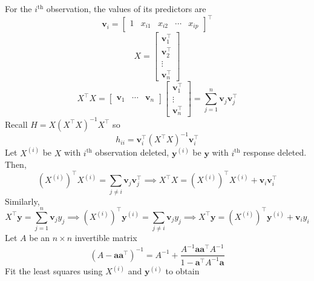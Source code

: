 For the $ i^{\text{th}} $ observation, the values
of its predictors are
\[ \symbf{v}_i=\begin{bmatrix}
        1 & x_{i1} & x_{i2} & \cdots & x_{i p}
    \end{bmatrix}^\top \]
\[ X=\begin{bmatrix}
        \symbf{v}_1^\top \\
        \symbf{v}_2^\top \\
        \vdots           \\
        \symbf{v}_n^\top
    \end{bmatrix} \]
\[ X^\top X=\begin{bmatrix}
        \symbf{v}_1 & \cdots & \symbf{v}_n
    \end{bmatrix}\begin{bmatrix}
        \symbf{v}_1^\top \\
        \vdots           \\
        \symbf{v}_n^\top
    \end{bmatrix}=\sum_{j=1}^{n}\symbf{v}_j\symbf{v}_j^\top \]
Recall $ H=X(X^\top X)^{-1}X^\top $ so
\[ h_{ii}=\symbf{v}_i^\top (X^\top X)^{-1}\symbf{v}_i^\top \]
Let $ X^{(i)} $ be $ X $ with $ i^{\text{th}} $ observation
deleted, $ \symbf{y}^{(i)} $ be $ \symbf{y} $ with $ i^{\text{th}} $
response deleted. Then,
\[ (X^{(i)})^{\top}X^{(i)}=\sum_{j\neq i}\symbf{v}_j\symbf{v}_j^\top
    \implies X^\top X=(X^{(i)})^\top X^{(i)}+\symbf{v}_i\symbf{v}_i^\top \]
Similarly,
\[ X^\top \symbf{y}=\sum_{j=1}^{n} \symbf{v}_j y_j\implies
    (X^{(i)})^\top \symbf{y}^{(i)}=\sum_{j\neq i}\symbf{v}_j y_j
    \implies X^{\top}\symbf{y}=(X^{(i)})^\top\symbf{y}^{(i)}+\symbf{v}_i y_i \]
Let $ A $ be an $ n\times n $ invertible matrix
\[ (A-\symbf{a}\symbf{a}^\top)^{-1}=A^{-1}+\frac{A^{-1}\symbf{a}\symbf{a}^\top
        A^{-1}}{1-\symbf{a}^\top A^{-1}\symbf{a}}  \]
Fit the least squares using $ X^{(i)} $ and $ \symbf{y}^{(i)} $
to obtain
